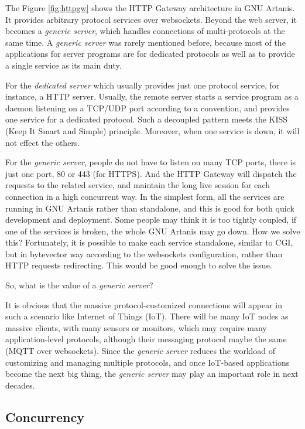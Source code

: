 \documentclass[numbers,numberedpars]{sigplanconf}
\begin{document}
The Figure \ref{fig:httpgw} shows the HTTP Gateway architecture in GNU Artanis.
It provides arbitrary protocol services over websockets. Beyond the web server, it becomes a {\it generic server}, which handles connections of multi-protocols at the
same time. A {\it generic server} was rarely mentioned before, because most of the applications for server programs are for dedicated protocols as well as to provide a single service as its main duty.

For the {\it dedicated server} which usually provides just one protocol service, for instance,  a HTTP server. Usually, the remote server starts a service program as a daemon listening on a TCP/UDP port according to a convention, and provides one service for a dedicated protocol. Such a decoupled pattern meets the KISS (Keep It Smart and Simple) principle. Moreover, when one service is down, it will not effect the others.

For the {\it generic server}, people do not have to listen on many TCP ports, there is just one port, 80 or 443 (for HTTPS). And the HTTP Gateway will dispatch the requests to the related service, and maintain the long live session for each connection in a high concurrent way.
In the simplest form, all the services are running in GNU Artanis rather than standalone, and this is good for both quick development and deployment.
Some people may think it is too tightly coupled, if one of the services is broken, the whole GNU Artanis may go down. How we solve this?
Fortunately, it is possible to make each service standalone, similar to CGI, but in bytevector way according to the websockets configuration, rather than HTTP requests redirecting. This would be good enough to solve the issue.

So, what is the value of a {\it generic server}?

It is obvious that the massive protocol-customized connections will appear in such a scenario like Internet of Things (IoT).
There will be many IoT nodes as massive clients, with many sensors or monitors, which may require many application-level protocols, although their messaging protocol maybe the same (MQTT over websockets). Since the {\it generic server} reduces the workload of customizing and managing multiple protocols, and once IoT-based applications become the next big thing, the {\it generic server} may play an important role in next decades. 

\subsection{Concurrency} \label{Concurrency}
\end{document}
